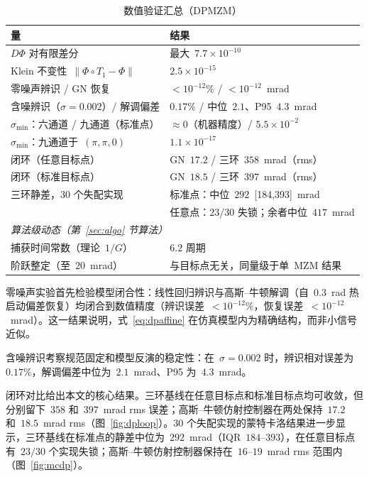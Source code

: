\documentclass[11pt,journal,onecolumn]{IEEEtran}
\theoremstyle{plain}
\theoremstyle{remark}
\begin{document}
\begin{table}[!t]
\caption{数值验证汇总（DPMZM）}
\label{tab:results}
\centering
\footnotesize
\setlength{\tabcolsep}{5pt}
\begin{tabular}{ll}
\toprule
量 & 结果\\
\midrule
$D\Phi$ 对有限差分 & 最大~$7.7\times10^{-10}$\\
Klein 不变性~$\|\Phi\circ T_1-\Phi\|$ & $2.5\times10^{-15}$\\
零噪声辨识 / GN 恢复 & $<10^{-12}\%$ / $<10^{-12}$~mrad\\
含噪辨识（$\sigma{=}0.002$）/ 解调偏差 & $0.17\%$ / 中位~$2.1$、P95~$4.3$~mrad\\
$\sigma_{\min}$：六通道 / 九通道（标准点） & $\approx 0$（机器精度）/ $5.5\times10^{-2}$\\
$\sigma_{\min}$：九通道于~$(\pi,\pi,0)$ & $1.1\times10^{-17}$\\
闭环（任意目标点） & GN~$17.2$ / 三环~$358$~mrad（rms）\\
闭环（标准目标点） & GN~$18.5$ / 三环~$397$~mrad（rms）\\
三环静差，30 个失配实现 & 标准点：中位~$292$~[184,393]~mrad\\
 & 任意点：$23/30$ 失锁；余者中位~$417$~mrad\\
\midrule
\multicolumn{2}{l}{\emph{算法级动态（第~\ref{sec:algo} 节算法）}}\\
捕获时间常数（理论~$1/G$） & $6.2$ 周期\\
阶跃整定（至~$20$~mrad） & 与目标点无关，同量级于单~MZM 结果~\cite{mzmaffine}\\
\bottomrule
\end{tabular}
\end{table}

零噪声实验首先检验模型闭合性：线性回归辨识与高斯--牛顿解调（自~$0.3$~rad 热启动偏差恢复）均闭合到数值精度（辨识误差~$<10^{-12}\%$，恢复误差~$<10^{-12}$~mrad）。这一结果说明，式~\eqref{eq:dpaffine} 在仿真模型内为精确结构，而非小信号近似。

含噪辨识考察规范固定和模型反演的稳定性：在~$\sigma{=}0.002$ 时，辨识相对误差为~$0.17\%$，解调偏差中位为~$2.1$~mrad、P95 为~$4.3$~mrad。

闭环对比给出本文的核心结果。三环基线在任意目标点和标准目标点均可收敛，但分别留下~$358$ 和~$397$~mrad rms 误差；高斯--牛顿仿射控制器在两处保持~$17.2$ 和~$18.5$~mrad rms（图~\ref{fig:dploop}）。30 个失配实现的蒙特卡洛结果进一步显示，三环基线在标准点的静差中位为~$292$~mrad（IQR~$184$--$393$），在任意目标点有~$23/30$ 个实现失锁；高斯--牛顿仿射控制器保持在~$16$--$19$~mrad rms 范围内（图~\ref{fig:mcdp}）。
\end{document}

